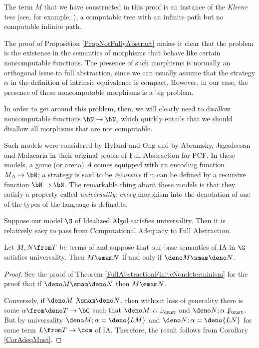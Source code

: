 \begin{remark}
  The term $M$ that we have constructed in this proof is an instance of the \emph{Kleene tree} (see, for example, \cite{KleeneTree}), a computable tree with an infinite path but no computable infinite path.
\end{remark}

The proof of Proposition \ref{PropNotFullyAbstract} makes it clear that the problem is the existence in the semantics of morphisms that behave like certain noncomputable functions.  
The presence of such morphisms is normally an orthogonal issue to full abstraction, since we can usually assume that the strategy $\alpha$ in the definition of intrinsic equivalence is compact.
However, in our case, the presence of these noncomputable morphisms is a big problem.

In order to get around this problem, then, we will clearly need to disallow noncomputable functions $\bN\to\bN$, which quickly entails that we should disallow all morphisms that are not computable.

Such models were considered by Hyland and Ong \cite{hoPcf} and by Abramsky, Jagadeesan and Malacaria \cite{ajmPcf} in their original proofs of Full Abstraction for PCF.
In these models, a game (or arena) $A$ comes equipped with an encoding function $M_A \to \bN$; a strategy is said to be \emph{recursive} if it can be defined by a recursive function $\bN \to \bN$.
The remarkable thing about these models is that they satisfy a property called \emph{universality}: \emph{every} morphism into the denotation of one of the types of the language is definable.

Suppose our model $\G$ of Idealized Algol satisfies universality.  
Then it is relatively easy to pass from Computational Adequacy to Full Abstraction.

\begin{theorem}
  Let $M,N\from T$ be terms of \IAX and suppose that our base semantics of IA in $\G$ satisfies universality.  
  Then $M\emam N$ if and only if $\deno M \smam \deno N$.
\end{theorem}
\begin{proof}
  See the proof of Theorem \ref{FullAbstractionFiniteNondeterminism} for the proof that if $\deno M \smam \deno N$ then $M\emam N$.  

  Conversely, if $\deno M \not\smam \deno N$, then without loss of generality there is some $\alpha\from\deno T \to \bC$ such that $\deno M;\alpha \downarrow_{\must}$ and $\deno N;\alpha\not\downarrow_{\must}$.  
  But by universality $\deno M;\alpha = \deno{LM}$ and $\deno N;\alpha=\deno{LN}$ for some term $L\from T \to \com$ of IA.  
  Therefore, the result follows from Corollary \ref{CorAdeqMust}.
\end{proof}

